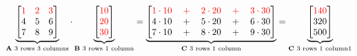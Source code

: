 \documentclass[11pt]{article}
\begin{document}
    \begin{equation*}
\underbrace{
\begin{bmatrix}
\color{red}1 & \color{red}2 & \color{red}3 \\
4 & 5 & 6 \\
7 & 8 & 9 \\
\end{bmatrix}
}_{\mathbf{A} \text{ 3 rows} \text{ 3 columns}}
\cdot
\underbrace{
\begin{bmatrix}
\color{red}{10} \\
\color{red}{20} \\
\color{red}{30} \\
\end{bmatrix}
}_{\mathbf{B} \text{  3 rows} \text{  1 column}}
=\underbrace{
\begin{bmatrix}
\color{red}{1 \cdot 10 \quad + \quad 2 \cdot 20 \quad + \quad 3 \cdot 30} \\
4 \cdot 10 \quad + \quad 5 \cdot 20 \quad + \quad 6 \cdot 30 \\
7 \cdot 10 \quad + \quad 8 \cdot 20 \quad + \quad 9 \cdot 30 \\
\end{bmatrix}
}_{\mathbf{C} \text{  3 rows} \text{  1 column}}
=\underbrace{
\begin{bmatrix}
\color{red}{140} \\
320 \\
500 \\
\end{bmatrix}
}_{\mathbf{C} \text{  3 rows} \text{  1 column1}}
\end{equation*}
\end{document}
